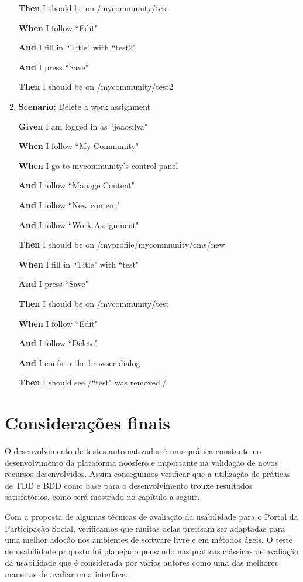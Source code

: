 \begin{enumerate}
    \textbf{Then} I should be on /mycommunity/test
    
    \textbf{When} I follow ``Edit"
    
    \textbf{And} I fill in ``Title" with ``test2"
    
    \textbf{And} I press ``Save"
    
    \textbf{Then} I should be on /mycommunity/test2

\item \textbf{Scenario:} Delete a work assignment  
   
    \textbf{Given} I am logged in as ``joaosilva"
   
    \textbf{When} I follow ``My Community"
   
    \textbf{When} I go to mycommunity's control panel
   
    \textbf{And} I follow ``Manage Content"
   
    \textbf{And} I follow ``New content"
   
    \textbf{And} I follow ``Work Assignment"
   
    \textbf{Then} I should be on /myprofile/mycommunity/cms/new
   
    \textbf{When} I fill in ``Title" with ``test"
   
    \textbf{And} I press ``Save"
   
    \textbf{Then} I should be on /mycommunity/test
   
    \textbf{When} I follow ``Edit"
   
    \textbf{And} I follow ``Delete"
   
    \textbf{And} I confirm the browser dialog
   
    \textbf{Then} I should see /``test" was removed./
    
\end{enumerate}

\section{Considerações finais}

O desenvolvimento de testes automatizados é uma prática constante no desenvolvimento da plataforma noosfero e importante na validação de novos recursos desenvolvidos. Assim conseguimos verificar que a utilização de práticas de TDD e BDD como base para o desenvolvimento trouxe resultados satisfatórios, como será mostrado no capítulo a seguir.

Com a proposta de algumas técnicas de avaliação da usabilidade para o Portal da Participação Social, verificamos que muitas delas precisam ser adaptadas para uma melhor adoção nos ambientes de software livre e em métodos ágeis. O teste de usabilidade proposto foi planejado pensando nas práticas clássicas de avaliação da usabilidade que é considerada por vários autores como uma das melhores maneiras de avaliar uma interface.





